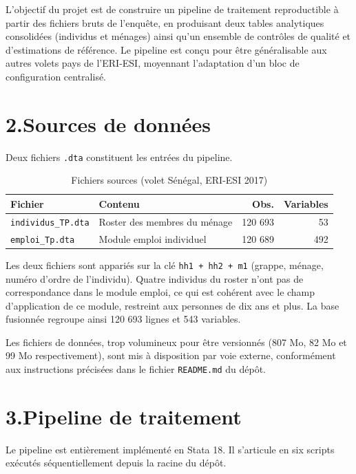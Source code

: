 \documentclass[12pt,a4paper]{article}
\begin{document}
L'objectif du projet est de construire un pipeline de traitement reproductible à
partir des fichiers bruts de l'enquête, en produisant deux tables analytiques
consolidées (individus et ménages) ainsi qu'un ensemble de contrôles de qualité et
d'estimations de référence. Le pipeline est conçu pour être généralisable aux autres
volets pays de l'ERI-ESI, moyennant l'adaptation d'un bloc de configuration centralisé.

\section*{2.\quad Sources de données}

Deux fichiers \texttt{.dta} constituent les entrées du pipeline.

\begin{table}[h!]
\centering
\begin{tabularx}{\linewidth}{lXrr}
\toprule
\textbf{Fichier} & \textbf{Contenu} & \textbf{Obs.} & \textbf{Variables} \\
\midrule
\texttt{individus\_TP.dta} & Roster des membres du ménage & 120 693 & 53 \\
\texttt{emploi\_Tp.dta}    & Module emploi individuel      & 120 689 & 492 \\
\bottomrule
\end{tabularx}
\caption{Fichiers sources (volet Sénégal, ERI-ESI 2017)}
\end{table}

Les deux fichiers sont appariés sur la clé \texttt{hh1 + hh2 + m1}
(grappe, ménage, numéro d'ordre de l'individu). Quatre individus du roster
n'ont pas de correspondance dans le module emploi, ce qui est cohérent avec
le champ d'application de ce module, restreint aux personnes de dix ans et plus.
La base fusionnée regroupe ainsi 120 693 lignes et 543 variables.

Les fichiers de données, trop volumineux pour être versionnés (807 Mo, 82 Mo
et 99 Mo respectivement), sont mis à disposition par voie externe, conformément
aux instructions précisées dans le fichier \texttt{README.md} du dépôt.

\section*{3.\quad Pipeline de traitement}

Le pipeline est entièrement implémenté en Stata 18. Il s'articule en six scripts
exécutés séquentiellement depuis la racine du dépôt.
\end{document}

